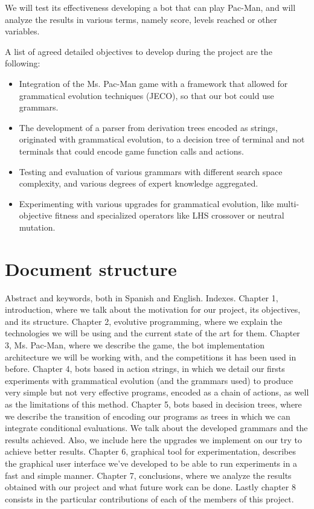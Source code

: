 We will test its effectiveness developing a bot that can play Pac-Man, and will analyze the results in various terms, namely score, levels reached or other variables.
 
A list of agreed detailed objectives to develop during the project are the following:
\begin{itemize}
\item Integration of the Ms. Pac-Man game with a framework that allowed for grammatical evolution techniques (JECO), so that our bot could use grammars.

\item The development of a parser from derivation trees encoded as strings, originated with grammatical evolution, to a decision tree of terminal and not terminals that could encode game function calls and actions.

\item Testing and evaluation of various grammars with different search space complexity, and various degrees of expert knowledge aggregated.

\item Experimenting with various upgrades for grammatical evolution, like multi-objective fitness and specialized operators like LHS crossover or neutral mutation. 
\end{itemize}

\section{Document structure}
Abstract and keywords, both in Spanish and English.
Indexes.
Chapter 1, introduction, where we talk about the motivation for our project, its objectives, and its structure.
Chapter 2, evolutive programming, where we explain the technologies we will be using and the current state of the art for them.
Chapter 3, Ms. Pac-Man, where we describe the game, the bot implementation architecture we will be working with, and the competitions it has been used in before.
Chapter 4, bots based in action strings, in which we detail our firsts experiments with grammatical evolution (and the grammars used) to produce very simple but not very effective programs, encoded as a chain of actions, as well as the limitations of this method.
Chapter 5, bots based in decision trees, where we describe the transition of encoding our programs as trees in which we can integrate conditional evaluations. We talk about the developed grammars and the results achieved. Also, we include here the upgrades we implement on our try to achieve better results.
Chapter 6, graphical tool for experimentation, describes the graphical user interface we’ve developed to be able to run experiments in a fast and simple manner.
Chapter 7, conclusions, where we analyze the results obtained with our project and what future work can be done.
Lastly chapter 8 consists in the particular contributions of each of the members of this project.
